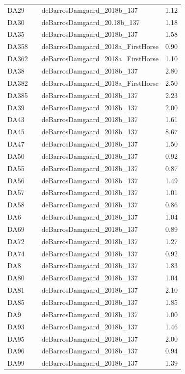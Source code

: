 \begin{longtable}[t]{lllr}
DA29 &  & deBarrosDamgaard\_2018b\_137 & 1.12\\
DA30 &  & deBarrosDamgaard\_20.18b\_137 & 1.18\\
DA35 &  & deBarrosDamgaard\_2018b\_137 & 1.58\\
DA358 &  & deBarrosDamgaard\_2018a\_FirstHorse & 0.90\\
DA362 &  & deBarrosDamgaard\_2018a\_FirstHorse & 1.10\\
DA38 &  & deBarrosDamgaard\_2018b\_137 & 2.80\\
DA382 &  & deBarrosDamgaard\_2018a\_FirstHorse & 2.50\\
DA385 &  & deBarrosDamgaard\_2018b\_137 & 2.23\\
DA39 &  & deBarrosDamgaard\_2018b\_137 & 2.00\\
DA43 &  & deBarrosDamgaard\_2018b\_137 & 1.61\\
DA45 &  & deBarrosDamgaard\_2018b\_137 & 8.67\\
DA47 &  & deBarrosDamgaard\_2018b\_137 & 1.50\\
DA50 &  & deBarrosDamgaard\_2018b\_137 & 0.92\\
DA55 &  & deBarrosDamgaard\_2018b\_137 & 0.87\\
DA56 &  & deBarrosDamgaard\_2018b\_137 & 1.49\\
DA57 &  & deBarrosDamgaard\_2018b\_137 & 1.01\\
DA58 &  & deBarrosDamgaard\_2018b\_137 & 0.86\\
DA6 &  & deBarrosDamgaard\_2018b\_137 & 1.04\\
DA69 &  & deBarrosDamgaard\_2018b\_137 & 0.89\\
DA72 &  & deBarrosDamgaard\_2018b\_137 & 1.27\\
DA74 &  & deBarrosDamgaard\_2018b\_137 & 0.92\\
DA8 &  & deBarrosDamgaard\_2018b\_137 & 1.83\\
DA80 &  & deBarrosDamgaard\_2018b\_137 & 1.04\\
DA81 &  & deBarrosDamgaard\_2018b\_137 & 2.10\\
DA85 &  & deBarrosDamgaard\_2018b\_137 & 1.85\\
DA9 &  & deBarrosDamgaard\_2018b\_137 & 1.00\\
DA93 &  & deBarrosDamgaard\_2018b\_137 & 1.46\\
DA95 &  & deBarrosDamgaard\_2018b\_137 & 2.00\\
DA96 &  & deBarrosDamgaard\_2018b\_137 & 0.94\\
DA99 &  & deBarrosDamgaard\_2018b\_137 & 1.39\\

\end{longtable}

